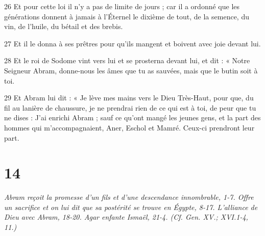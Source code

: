 \par 26 Et pour cette loi il n'y a pas de limite de jours ; car il a ordonné que les générations donnent à jamais à l'Éternel le dixième de tout, de la semence, du vin, de l'huile, du bétail et des brebis.
\par 27 Et il le donna à ses prêtres pour qu'ils mangent et boivent avec joie devant lui.
\par 28 Et le roi de Sodome vint vers lui et se prosterna devant lui, et dit : « Notre Seigneur Abram, donne-nous les âmes que tu as sauvées, mais que le butin soit à toi.
\par 29 Et Abram lui dit : « Je lève mes mains vers le Dieu Très-Haut, pour que, du fil au lanière de chaussure, je ne prendrai rien de ce qui est à toi, de peur que tu ne dises : J'ai enrichi Abram ; sauf ce qu'ont mangé les jeunes gens, et la part des hommes qui m'accompagnaient, Aner, Eschol et Mamré. Ceux-ci prendront leur part.

\chapter{14}

\par \textit{Abram reçoit la promesse d'un fils et d'une descendance innombrable, 1-7. Offre un sacrifice et on lui dit que sa postérité se trouve en Égypte, 8-17. L'alliance de Dieu avec Abram, 18-20. Agar enfante Ismaël, 21-4. (Cf. Gen. XV.; XVI.1-4, 11.)}


